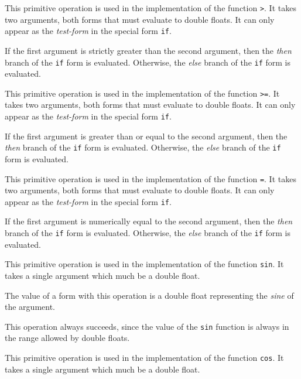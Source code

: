 
This primitive operation is used in the implementation of the
\commonlisp{} function \texttt{>}.  It takes two arguments, both forms
that must evaluate to double floats.  It can only appear as the
\emph{test-form} in the special form \texttt{if}.

If the first argument is strictly greater than the second argument,
then the \emph{then} branch of the \texttt{if} form is evaluated.
Otherwise, the \emph{else} branch of the \texttt{if} form is
evaluated.


This primitive operation is used in the implementation of the
\commonlisp{} function \texttt{>=}.  It takes two arguments, both forms
that must evaluate to double floats.  It can only appear as the
\emph{test-form} in the special form \texttt{if}.

If the first argument is greater than or equal to the second argument,
then the \emph{then} branch of the \texttt{if} form is evaluated.
Otherwise, the \emph{else} branch of the \texttt{if} form is
evaluated.


This primitive operation is used in the implementation of the
\commonlisp{} function \texttt{=}.  It takes two arguments, both forms
that must evaluate to double floats.  It can only appear as the
\emph{test-form} in the special form \texttt{if}.

If the first argument is numerically equal to the second argument,
then the \emph{then} branch of the \texttt{if} form is evaluated.
Otherwise, the \emph{else} branch of the \texttt{if} form is
evaluated.


This primitive operation is used in the implementation of the
\commonlisp{} function \texttt{sin}.  It takes a single argument which
much be a double float.

The value of a form with this operation is a double float representing
the \emph{sine} of the argument.

This operation always succeeds, since the value of the \texttt{sin}
function is always in the range allowed by double floats.


This primitive operation is used in the implementation of the
\commonlisp{} function \texttt{cos}.  It takes a single argument which
much be a double float.

